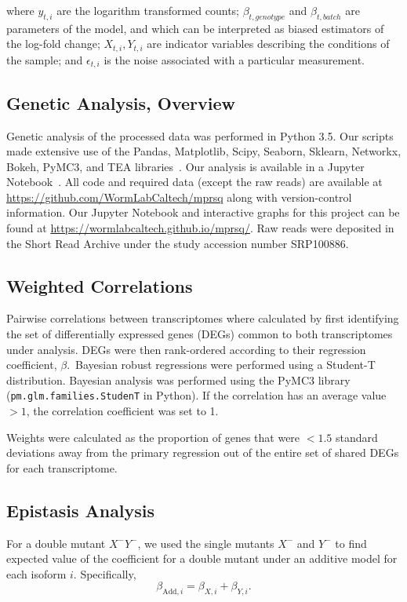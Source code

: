 where $y_{t, i}$ are the logarithm transformed counts; $\beta_{t, genotype}$ and
$\beta_{t, batch}$ are parameters of the model, and which can be interpreted as
biased estimators of the log-fold change; $X_{t, i}, Y_{t, i}$ are indicator
variables describing the conditions of the sample; and $\epsilon_{t, i}$ is the
noise associated with a particular measurement.

\subsection*{Genetic Analysis, Overview}
Genetic analysis of the processed data was performed in Python 3.5. Our scripts
made extensive use of the Pandas, Matplotlib, Scipy, Seaborn, Sklearn, Networkx,
Bokeh, PyMC3, and TEA libraries~\citep{Team2014,McKinney2011,Oliphant2007,
Pedregosa2012,Salvatier2015,VanDerWalt2011,Hunter2007,Angeles-Albores2016,Waskom}.
Our analysis is available in a Jupyter Notebook~\citep{Perez2007}. All code and
required data (except the raw reads) are available at
\url{https://github.com/WormLabCaltech/mprsq} along with version-control
information. Our Jupyter Notebook and interactive graphs for this project can be
found at \url{https://wormlabcaltech.github.io/mprsq/}. Raw reads were deposited
in the Short Read Archive under the study accession number SRP100886.


\subsection*{Weighted Correlations}
Pairwise correlations between transcriptomes where calculated by first identifying
the set of differentially expressed genes (DEGs) common to both transcriptomes under
analysis. DEGs were then rank-ordered according to their regression coefficient,
$\beta$.\ Bayesian robust regressions were performed using a Student-T distribution.
Bayesian analysis was performed using the PyMC3 library~\citep{Salvatier2015}
(\texttt{pm.glm.families.StudenT} in Python). If the correlation has an average
value $>1$, the correlation coefficient was set to 1.

Weights were calculated as the proportion of genes that were $<1.5$ standard
deviations away from the primary regression out of the entire set of shared DEGs
for each transcriptome.

\subsection*{Epistasis Analysis}
For a double mutant $X^-Y^-$, we used the single mutants $X^-$ and $Y^-$ to
find expected value of the coefficient for a double mutant under an additive model
for each isoform $i$.
Specifically,
\begin{equation}
  \beta_{\mathrm{Add},i} = \beta_{X,i} + \beta_{Y,i}.
\end{equation}

